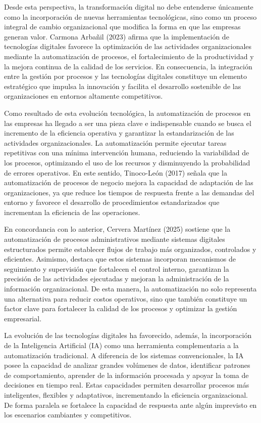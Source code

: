 Desde esta perspectiva, la transformación digital no debe entenderse únicamente como la incorporación de nuevas herramientas tecnológicas, sino como un proceso integral de cambio organizacional que modifica la forma en que las empresas generan valor. Carmona Arbañil (2023) afirma que la implementación de tecnologías digitales favorece la optimización de las actividades organizacionales mediante la automatización de procesos, el fortalecimiento de la productividad y la mejora continua de la calidad de los servicios. En consecuencia, la integración entre la gestión por procesos y las tecnologías digitales constituye un elemento estratégico que impulsa la innovación y facilita el desarrollo sostenible de las organizaciones en entornos altamente competitivos.

Como resultado de esta evolución tecnológica, la automatización de procesos en las empresas ha llegado a ser una pieza clave e indispensable cuando se busca el incremento de la eficiencia operativa y garantizar la estandarización de las actividades organizacionales. La automatización permite ejecutar tareas repetitivas con una mínima intervención humana, reduciendo la variabilidad de los procesos, optimizando el uso de los recursos y disminuyendo la probabilidad de errores operativos. En este sentido, Tinoco-León (2017) señala que la automatización de procesos de negocio mejora la capacidad de adaptación de las organizaciones, ya que reduce los tiempos de respuesta frente a las demandas del entorno y favorece el desarrollo de procedimientos estandarizados que incrementan la eficiencia de las operaciones.

En concordancia con lo anterior, Cervera Martínez (2025) sostiene que la automatización de procesos administrativos mediante sistemas digitales estructurados permite establecer flujos de trabajo más organizados, controlados y eficientes. Asimismo, destaca que estos sistemas incorporan mecanismos de seguimiento y supervisión que fortalecen el control interno, garantizan la precisión de las actividades ejecutadas y mejoran la administración de la información organizacional. De esta manera, la automatización no solo representa una alternativa para reducir costos operativos, sino que también constituye un factor clave para fortalecer la calidad de los procesos y optimizar la gestión empresarial.

La evolución de las tecnologías digitales ha favorecido, además, la incorporación de la Inteligencia Artificial (IA) como una herramienta complementaria a la automatización tradicional. A diferencia de los sistemas convencionales, la IA posee la capacidad de analizar grandes volúmenes de datos, identificar patrones de comportamiento, aprender de la información procesada y apoyar la toma de decisiones en tiempo real. Estas capacidades permiten desarrollar procesos más inteligentes, flexibles y adaptativos, incrementando la eficiencia organizacional. De forma paralela se fortalece la capacidad de respuesta ante algún imprevisto en los escenarios cambiantes y competitivos.

